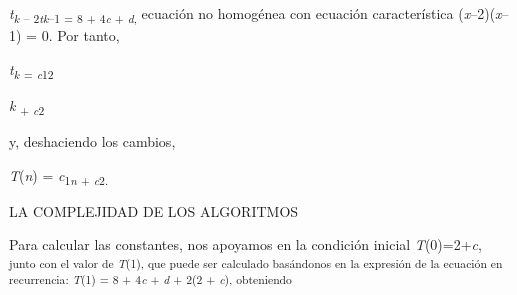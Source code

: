 \documentclass[12pt]{article}
\renewcommand{\_}{\kern-1.5pt\textunderscore\kern-1.5pt}
\begin{document}
\begin{adjustwidth}{0.77in}{0.74in}
\begin{Center}
{\fontsize{10pt}{12.0pt}\selectfont \textit{t\textsubscript{k }}\textsubscript{– 2\textit{tk}–1 = 8 + 4\textit{c }+ \textit{d}, }ecuación no homogénea con ecuación característica (\textit{x}–2)(\textit{x}–1) = 0. Por tanto, \par}
\end{Center}\par

\end{adjustwidth}

\begin{adjustwidth}{0.77in}{2.76in}
{\fontsize{10pt}{12.0pt}\selectfont \textit{t\textsubscript{k }}\textsubscript{= \textit{c}12}{\fontsize{7pt}{8.4pt}\selectfont \textit{k }\textsubscript{+ \textit{c}2 }{\fontsize{10pt}{12.0pt}\selectfont y, deshaciendo los cambios, \par}\par}\par}\par

\end{adjustwidth}

\begin{adjustwidth}{2.67in}{2.66in}
{\fontsize{10pt}{12.0pt}\selectfont \textit{T}(\textit{n}) = \textit{c}\textsubscript{1\textit{n }+ \textit{c}2. }\par}\par

\end{adjustwidth}

\begin{adjustwidth}{0.58in}{0.57in}
{\fontsize{7pt}{8.4pt}\selectfont LA COMPLEJIDAD DE LOS ALGORITMOS {\fontsize{10pt}{12.0pt} \par}\par}\par

\end{adjustwidth}

\begin{adjustwidth}{0.77in}{0.57in}
{\fontsize{10pt}{12.0pt}\selectfont Para calcular las constantes, nos apoyamos en la condición inicial \textit{T}(0)=2+\textit{c}, \textsubscript{junto con el valor de \textit{T}(1), que puede ser calculado basándonos en la expresión de la ecuación en recurrencia: \textit{T}(1) = 8 + 4\textit{c }+ \textit{d }+ 2(2 + \textit{c}), obteniendo }\par}\par

\end{adjustwidth}
\end{document}
